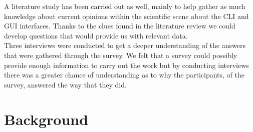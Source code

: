 \documentclass[a4paper,oneside]{bth} %
\begin{document}
		A literature study has been carried out as well, mainly to help  gather as much knowledge about current opinions within the scientific scene about the CLI and GUI interfaces.
		Thanks to the clues found in the literature review we could develop questions that would provide us with relevant data.\\
		Three interviews were conducted to get a deeper understanding of the answers that were gathered through the survey.
		We felt that a survey could possibly provide enough information to carry out the work but by conducting interviews there was a greater chance of understanding as to why the participants, of the survey, answered the way that they did.
		
		\chapter{Background}
\end{document}
